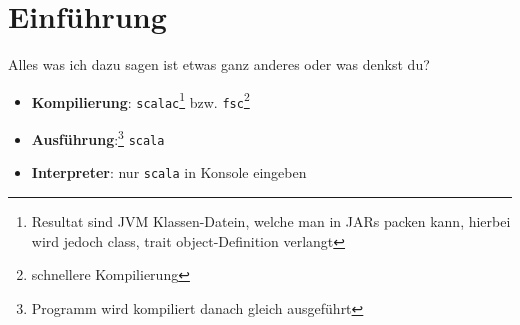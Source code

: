 \newcommand{\home}{../../latex/styles}















%




\section{Einführung}
Alles was ich dazu sagen ist etwas ganz anderes oder was denkst du?
\begin{itemize}
  \item \textbf{Kompilierung}: \texttt{scalac}\footnote{Resultat sind JVM
  Klassen-Datein, welche man in JARs packen kann, hierbei wird jedoch class,
  trait \oder object-Definition verlangt} bzw. 
  \texttt{fsc}\footnote{schnellere Kompilierung}
  \item \textbf{Ausführung}:\footnote{Programm wird kompiliert \und danach
  gleich ausgeführt} \texttt{scala}
  \item \textbf{Interpreter}: nur \texttt{scala} in Konsole eingeben
\end{itemize}


